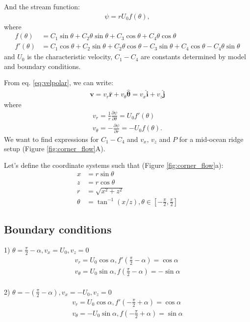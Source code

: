 \documentclass[a4paper,11pt]{article}
\begin{document}
And the stream function:
\begin{align}
\psi = r U_0 f(\theta),
\end{align}
where
\begin{align}
f(\theta) &= C_1\sin\theta+C_2\theta\sin\theta+C_3\cos\theta+C_4\theta\cos\theta \\
f'(\theta) &= C_1\cos\theta+C_2\sin\theta+C_2\theta\cos\theta-C_3\sin\theta+C_4\cos\theta-C_4\theta\sin\theta 
\end{align}
and $U_0$ is the characteristic velocity, $C_1-C_4$ are constants determined by model and boundary conditions. 

From eq. \ref{eq:velpolar}, we can write:
\begin{align}
\textbf{v} = v_r\hat{\textbf{r}}+v_\theta\hat{\bm{\theta}} = v_x\hat{\textbf{i}}+v_z\hat{\textbf{j}} \label{eq:vgen}
\end{align}
where 
\begin{align}
v_r= \frac{1}{r}\frac{\partial\psi}{\partial\theta} = U_0 f'(\theta)\\
v_\theta=-\frac{\partial\psi}{\partial r} = -U_0 f(\theta). 
\end{align}
We want to find expressions for $C_1-C_4$ and $v_x$, $v_z$ and $P$ for a mid-ocean ridge setup (Figure \ref{fig:corner_flow}A).

Let's define the coordinate systems such that (Figure \ref{fig:corner_flow}a):
\begin{align}
x &= r\sin\theta \\
z &= r\cos\theta \\
r &= \sqrt{x^2+z^2}\\
\theta &= \tan^{-1}({x/z}), \theta\in\left[-\frac{\pi}{2},\frac{\pi}{2}\right]
\end{align}

\subsection{Boundary conditions}

1) $\theta = \frac{\pi}{2}-\alpha, v_x = U_0, v_z = 0$
\begin{align}
v_r= U_0\cos\alpha, f'(\frac{\pi}{2}-\alpha) = \cos\alpha\\
v_\theta=U_0\sin\alpha, f(\frac{\pi}{2}-\alpha) = -\sin\alpha\\
\end{align}

2) $\theta = -(\frac{\pi}{2}-\alpha), v_x = -U_0, v_z = 0$
\begin{align}
v_r= U_0\cos\alpha, f'(-\frac{\pi}{2}+\alpha) = \cos\alpha\\
v_\theta=-U_0\sin\alpha, f(-\frac{\pi}{2}+\alpha) = \sin\alpha\\
\end{align}
\end{document}
